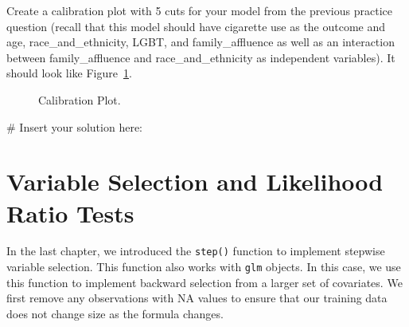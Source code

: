 \documentclass[
  letterpaper,
]{krantz}
\makeatletter
\newenvironment{Shaded}{\begin{snugshade}}{\end{snugshade}}
\newcommand{\CommentTok}[1]{\textcolor[rgb]{0.37,0.37,0.37}{#1}}
\newenvironment{kframe}{%
\medskip{}
\setlength{\fboxsep}{.8em}
 \def\at@end@of@kframe{}%
 \ifinner\ifhmode%
  \def\at@end@of@kframe{\end{minipage}}%
  \begin{minipage}{\columnwidth}%
 \fi\fi%
 \def\FrameCommand##1{\hskip\@totalleftmargin \hskip-\fboxsep
 \colorbox{shadecolor}{##1}\hskip-\fboxsep
     \hskip-\linewidth \hskip-\@totalleftmargin \hskip\columnwidth}%
 \MakeFramed {\advance\hsize-\width
   \@totalleftmargin\z@ \linewidth\hsize
   \@setminipage}}%
 {\par\unskip\endMakeFramed%
 \at@end@of@kframe}
\renewenvironment{Shaded}{\begin{kframe}}{\end{kframe}}
\makeatother
\begin{document}
Create a calibration plot with 5 cuts for your model from the previous
practice question (recall that this model should have cigarette use as
the outcome and age, race\_and\_ethnicity, LGBT, and family\_affluence
as well as an interaction between family\_affluence and
race\_and\_ethnicity as independent variables). It should look like
Figure~\ref{fig-calibration-plot}.

\begin{figure}


\caption{\label{fig-calibration-plot}Calibration Plot.}

\end{figure}%

\begin{Shaded}
\begin{Highlighting}[]
\CommentTok{\# Insert your solution here:}
\end{Highlighting}
\end{Shaded}

\section{Variable Selection and Likelihood Ratio
Tests}\label{variable-selection-and-likelihood-ratio-tests}

In the last chapter, we introduced the \texttt{step()} function to
implement stepwise variable selection. This function also works with
\texttt{glm} objects. In this case, we use this function to implement
backward selection from a larger set of covariates. We first remove any
observations with NA values to ensure that our training data does not
change size as the formula changes.
\end{document}
